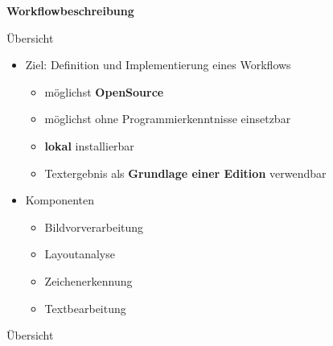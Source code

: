 \documentclass{bbawslides}
\begin{document}
\begin{bbawpart}{\Large\bf Workflowbeschreibung}
\end{bbawpart}

\begin{bbawslide}{Übersicht}
  \vspace*{7mm}%
  \centerslidestrue%
  \begin{itemize}
    \item Ziel: Definition und Implementierung eines Workflows
    \begin{itemize}\small
      \item möglichst \textbf{OpenSource}
      \item möglichst ohne Programmierkenntnisse einsetzbar
      \item \textbf{lokal} installierbar 
      \item Textergebnis als \textbf{Grundlage einer Edition} verwendbar
    \end{itemize}
    \item Komponenten
    \begin{itemize}\small
      \item Bildvorverarbeitung
      \item Layoutanalyse
      \item Zeichenerkennung
      \item Textbearbeitung
    \end{itemize}
  \end{itemize}
\end{bbawslide}

\begin{bbawslide}{Übersicht}
  \vspace*{2mm}%
  \begin{center}
  \end{center}
\end{bbawslide}
\end{document}
